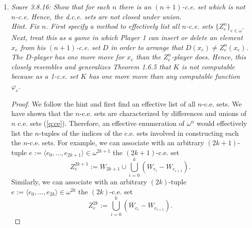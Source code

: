 \documentclass{article}
\begin{document}
\begin{enumerate}[label={\bf Q\arabic*:}]
\begin{proof}
      Consider the Turing functional $\Phi_e(x)$ such that given arbitrary
      $X\in2^\omega$ and $x\in\omega$, first computes the set
      $\{a<f(x): X(a)=1\}$, and then the set $\{f(0),\ldots,f(x-1)\}$, and
      returns 1 if the first set is not contained in the second, and
      returns 0 otherwise. Then $\Phi_e$ is total because $f$ is total
      recursive. Also, $D=\Phi_e^A$. Thus from the Truth-table theorem
      (Nerode, Theorem 3.8.5), $D\leq_{tt}A$.
    \end{proof}

  \item \it Soare 3.8.16: Show that for each $n$ there is an $(n+1)$-c.e.
    set which is not $n$-c.e. Hence, the d.c.e. sets are not closed under
    union. \\

    Hint. Fix $n$. First specify a method to effectively list all $n$-c.e.
    sets $\{Z_e^n\}_{e\in\omega}$. Next, treat this as a game in which
    Player 1 can insert or delete an element $x_e$ from his $(n+1)$-c.e.
    set $D$ in order to arrange that $D(x_e)\neq Z_e^n(x_e)$. The
    $D$-player has one more move for $x_e$ than the $Z_e^n$-player does.
    Hence, this closely resembles and generalizes Theorem 1.6.5 that $K$ is
    not computable because as a 1-c.e. set $K$ has one more move than any
    computable function $\varphi_e$.

    \begin{proof}
      We follow the hint and first find an effective list of all $n$-c.e.
      sets. We have shown that the $n$-c.e. sets are characterized by
      differences and unions of $n$ c.e. sets (\ref{q:ce}). Therefore,
      an effective enumeration of $\omega^n$ would effectively list the
      $n$-tuples of the indices of the c.e. sets involved in constructing
      each the $n$-c.e. sets. For example, we can associate with an arbitrary
      $(2k+1)$-tuple $e:=\langle e_0,\ldots,e_{2k+1}\rangle\in
      \omega^{2k+1}$ the $(2k+1)$-c.e. set
      \[Z_{e}^{2k+1} :=W_{2k+1} \cup \bigcup_{i=0}^k (W_{e_i}-W_{e_{i+1}}).\]
      Similarly, we can associate with an arbitrary
      $(2k)$-tuple $e:=\langle e_0,\ldots,e_{2k}\rangle\in
      \omega^{2k}$ the $(2k)$-c.e. set
      \[Z_{e}^{2k} :=\bigcup_{i=0}^k (W_{e_i}-W_{e_{i+1}}).\]


\end{proof}
\end{enumerate}
\end{document}
